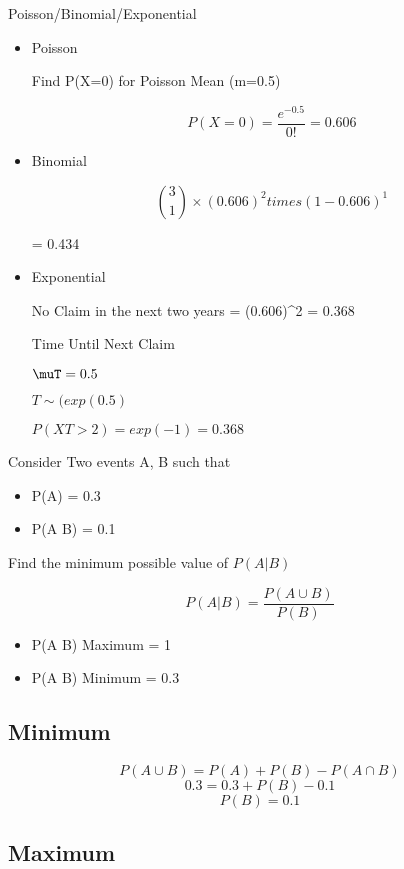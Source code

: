 
Poisson/Binomial/Exponential

\begin{itemize}
\item  Poisson

Find P(X=0) for Poisson Mean (m=0.5)


\[ P(X=0) = \frac{e^{-0.5}}{0!}  = 0.606 \]


\item Binomial

\[ { 3 \choose 1} \times (0.606)^2 times (1-0.606)^1 \]

= 0.434

\item Exponential

No Claim in the next two years
= (0.606)^2 = 0.368

Time Until Next Claim

$\muT = 0.5$

$T \sim (exp(0.5)$

$P(XT >2) = exp(-1) = 0.368$

\end{itemize}

Consider Two events A, B such that

\begin{itemize}
\item P(A) = 0.3
\item P(A \cap B) = 0.1
\end{itemize}

Find the minimum possible value of $P(A|B)$

\[ P(A|B) = \frac{P(A \cup B) }{P(B)}\]

\begin{itemize}
\item P(A \cup B) Maximum = 1
\item P(A \cup B) Minimum = 0.3
\end{itemize}

\subsection*{Minimum}

\[ P(A \cup B) = P(A) + P(B) - P(A \cap B)\]
\[ 0.3 = 0.3 + P(B) - 0.1 \]
\[ P(B) = 0.1\] 

\subsection*{Maximum}

